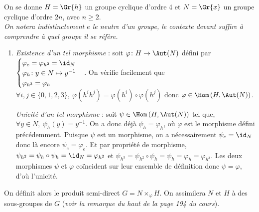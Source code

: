 
On se donne $H=\Gr{h}$ un groupe cyclique d'ordre 4 et $N=\Gr{x}$ un groupe cyclique d'ordre $2n$, avec $n\geqslant 2$.\\\emph{On notera indistinctement $e$ le neutre d'un groupe, le contexte devant suffire à comprendre à quel groupe il se réfère.}
\begin{enumerate}
 \item \emph{Existence d'un tel morphisme} : soit $\varphi \colon H\to \Aut(N)$ défini par 
 $\begin{cases}\varphi_e = \varphi_{h^2} = \id_N \\ \varphi_h \colon y\in N \mapsto y^{-1}\\ \varphi_{h^3} = \varphi_h \end{cases}$.
On vérifie facilement que $\forall i,j \in \{0,1,2,3\},~ \varphi(h^i h^j) = \varphi(h^i) \circ  \varphi(h^j)$ donc $\varphi \in \Hom\left(H, \Aut(N)\right)$.

\emph{Unicité d'un tel morphisme} : soit $\psi \in \Hom\left(H, \Aut(N)\right)$ tel que, $\forall y\in N,~ \psi_h(y) = y^{-1}$. On a donc déjà $\psi_h = \varphi_h$, où $\varphi$ est le morphisme défini précédemment.
Puisque $\psi$ est un morphisme, on a nécessairement $\psi_e = \id_N$ donc là encore $\psi_e = \varphi_e$. Et par propriété de morphisme, $\psi_{h^2} = \psi_h \circ \psi_ h = \id_N = \varphi_{h^2}$ 
et $\psi_{h^3}= \psi_{h^2} \circ \psi_ h = \psi_h = \varphi_{h} = \varphi_{h^3}$. Les deux morphismes $\psi$ et $\varphi$ coïncident sur leur ensemble de définition donc $\psi=\varphi$, d'où l'unicité.

\end{enumerate}

On définit alors le produit semi-direct $G = N \times_{\varphi} H$. On assimilera $N$ et $H$ à des sous-groupes de $G$ (\emph{voir la remarque du haut de la page 194 du cours}).

